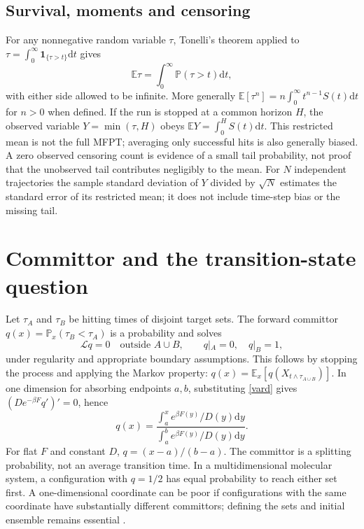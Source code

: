 \documentclass[11pt,a4paper]{article}
\newcommand{\dd}{\mathrm d}
\newcommand{\E}{\mathbb E}
\newcommand{\Pp}{\mathbb P}
\newcommand{\Lop}{\mathcal L}
\theoremstyle{remark}\newtheorem*{remark}{Physical interpretation}
\begin{document}
\subsection{Survival, moments and censoring}
For any nonnegative random variable $\tau$, Tonelli's theorem applied to $\tau=\int_0^\infty\mathbf 1_{\{\tau>t\}}\dd t$ gives
\begin{equation}\E\tau=\int_0^\infty\Pp(\tau>t)\dd t,\end{equation}
with either side allowed to be infinite. More generally $\E[\tau^n]=n\int_0^\infty t^{n-1}S(t)\dd t$ for $n>0$ when defined. If the run is stopped at a common horizon $H$, the observed variable $Y=\min(\tau,H)$ obeys $\E Y=\int_0^H S(t)\dd t$. This restricted mean is not the full MFPT; averaging only successful hits is also generally biased. A zero observed censoring count is evidence of a small tail probability, not proof that the unobserved tail contributes negligibly to the mean. For $N$ independent trajectories the sample standard deviation of $Y$ divided by $\sqrt N$ estimates the standard error of its restricted mean; it does not include time-step bias or the missing tail.

\section{Committor and the transition-state question}
Let $\tau_A$ and $\tau_B$ be hitting times of disjoint target sets. The forward committor $q(x)=\Pp_x(\tau_B<\tau_A)$ is a probability and solves
\begin{equation}\Lop q=0\quad\text{outside }A\cup B,\qquad q|_A=0,\quad q|_B=1,\end{equation}
under regularity and appropriate boundary assumptions. This follows by stopping the process and applying the Markov property: $q(x)=\E_x[q(X_{t\wedge\tau_{A\cup B}})]$. In one dimension for absorbing endpoints $a,b$, substituting \eqref{vard} gives $(D e^{-\beta F}q')'=0$, hence
\begin{equation}\boxed{q(x)=\frac{\int_a^x e^{\beta F(y)}/D(y)\dd y}{\int_a^b e^{\beta F(y)}/D(y)\dd y}.}\end{equation}
For flat $F$ and constant $D$, $q=(x-a)/(b-a)$. The committor is a splitting probability, not an average transition time. In a multidimensional molecular system, a configuration with $q=1/2$ has equal probability to reach either set first. A one-dimensional coordinate can be poor if configurations with the same coordinate have substantially different committors; defining the sets and initial ensemble remains essential \cite{evanden,hummer2004}.
\end{document}
